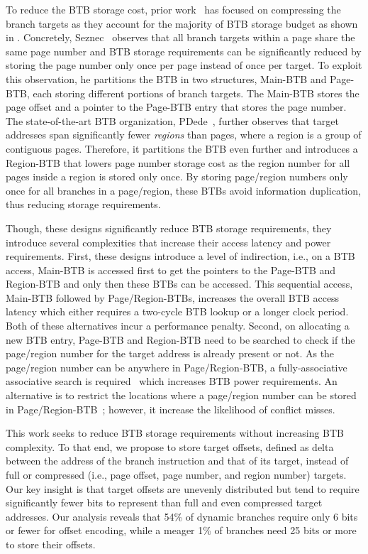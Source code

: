 To reduce the BTB storage cost, prior work~\cite{DUPN, ittage, pdede} has focused on compressing the branch targets as they account for the majority of BTB storage budget as shown in . Concretely, Seznec~\cite{DUPN, ittage} observes that all branch targets within a page share the same page number and BTB storage requirements can be significantly reduced by storing the page number only once per page instead of once per target. To exploit this observation, he partitions the BTB in two structures, Main-BTB and Page-BTB, each storing different portions of branch targets. The Main-BTB stores the page offset and a pointer to the Page-BTB entry that stores the page number. The state-of-the-art BTB organization, PDede~\cite{pdede}, further observes that target addresses span significantly fewer \emph{regions} than pages, where a region is a group of contiguous pages. Therefore, it partitions the BTB even further and introduces a Region-BTB that lowers page number storage cost as the region number for all pages inside a region is stored only once. By storing page/region numbers only once for all branches in a page/region, these BTBs avoid information duplication, thus reducing storage requirements.

Though, these designs significantly reduce BTB storage requirements, they introduce several complexities that increase their access latency and power requirements. First, these designs introduce a level of indirection, i.e., on a BTB access, Main-BTB is accessed first to get the pointers to the Page-BTB and Region-BTB and only then these BTBs can be accessed. This sequential access, Main-BTB followed by Page/Region-BTBs, increases the overall BTB access latency which either requires a two-cycle BTB lookup or a longer clock period. Both of these alternatives incur a performance penalty. Second, on allocating a new BTB entry, Page-BTB and Region-BTB need to be searched to check if the page/region number for the target address is already present or not. As the page/region number can be anywhere in Page/Region-BTB, a fully-associative associative search is required~\cite{ittage} which increases BTB power requirements. An alternative is to restrict the locations where a page/region number can be stored in Page/Region-BTB~\cite{pdede}; however, it increase the likelihood of conflict misses.

This work seeks to reduce BTB storage requirements without increasing BTB complexity. To that end, we propose to store target offsets, defined as delta between the address of the branch instruction and that of its target, instead of full or compressed (i.e., page offset, page number, and region number) targets. Our key insight is that target offsets are unevenly distributed but tend to require significantly fewer bits to represent than full and even compressed target addresses. Our analysis reveals that 54\% of dynamic branches require only 6 bits or fewer for offset encoding, while a meager 1\% of branches need 25 bits or more to store their offsets.

